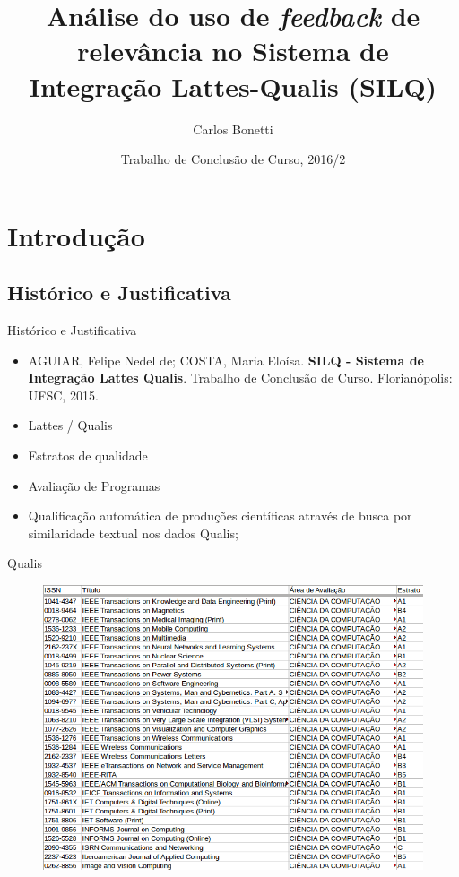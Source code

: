 \documentclass{beamer}
\title{Análise do uso de \textit{feedback} de relevância no Sistema de Integração Lattes-Qualis (SILQ)}
\author{Carlos Bonetti\inst{1}}
\institute[Universidade Federal de Santa Catarina] %
{
  \inst{1}%
  Bacharelando de Ciência da Computação\\
  Departamento de Informática e Estatística\\
  Centro Tecnológico\\
  Universidade Federal de Santa Catarina\\
  \hfill \\
  Orientação: Profª. Drª. Carina F. Dorneles
}
\date{Trabalho de Conclusão de Curso, 2016/2}
\begin{document}
\begin{frame}
  \titlepage
\end{frame}


\section{Introdução}

\subsection{Histórico e Justificativa}


\begin{frame}{Histórico e Justificativa}
  \begin{itemize}
    \item AGUIAR, Felipe Nedel de; COSTA, Maria Eloísa. \textbf{SILQ - Sistema de Integração Lattes Qualis}. Trabalho de Conclusão de Curso. Florianópolis: UFSC, 2015.
    \item Lattes / Qualis
    \item Estratos de qualidade
    \item Avaliação de Programas
    \item Qualificação automática de produções científicas através de busca por similaridade textual nos dados Qualis;
  \end{itemize}
\end{frame}

\begin{frame}{Qualis}
 \begin{figure}
   \includegraphics[scale=0.4]{figuras/qualis_exemplo.png}
 \end{figure}
\end{frame}
\end{document}
